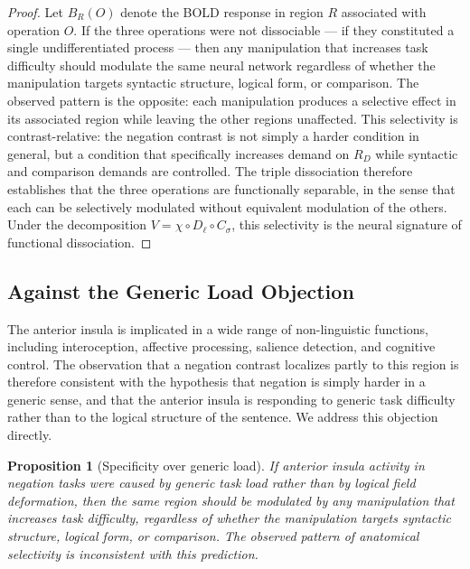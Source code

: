 \documentclass[12pt]{article}
\newtheorem{proposition}[theorem]{Proposition}
\theoremstyle{remark}
\begin{document}
\begin{proof}
Let $B_R(O)$ denote the BOLD response in region $R$ associated with
operation $O$. If the three operations were not dissociable --- if they
constituted a single undifferentiated process --- then any manipulation
that increases task difficulty should modulate the same neural network
regardless of whether the manipulation targets syntactic structure,
logical form, or comparison. The observed pattern is the opposite: each
manipulation produces a selective effect in its associated region while
leaving the other regions unaffected. This selectivity is
contrast-relative: the negation contrast is not simply a harder condition
in general, but a condition that specifically increases demand on $R_D$
while syntactic and comparison demands are controlled. The triple
dissociation therefore establishes that the three operations are
functionally separable, in the sense that each can be selectively
modulated without equivalent modulation of the others. Under the
decomposition $V = \chi \circ D_\ell \circ C_{\sigma}$, this selectivity
is the neural signature of functional dissociation.
\end{proof}

\subsection{Against the Generic Load Objection}

The anterior insula is implicated in a wide range of non-linguistic
functions, including interoception, affective processing, salience
detection, and cognitive control. The observation that a negation
contrast localizes partly to this region is therefore consistent with the
hypothesis that negation is simply harder in a generic sense, and that
the anterior insula is responding to generic task difficulty rather than
to the logical structure of the sentence. We address this objection
directly.

\begin{proposition}[Specificity over generic load]
\label{prop:specificity}
If anterior insula activity in negation tasks were caused by generic task
load rather than by logical field deformation, then the same region
should be modulated by any manipulation that increases task difficulty,
regardless of whether the manipulation targets syntactic structure,
logical form, or comparison. The observed pattern of anatomical
selectivity is inconsistent with this prediction.
\end{proposition}
\end{document}
